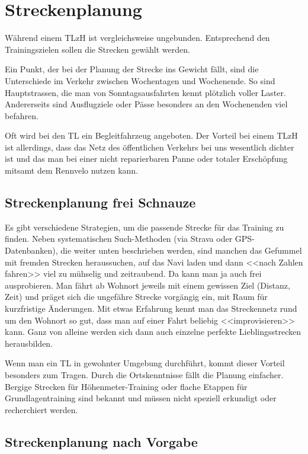 \documentclass[a4paper,DIV13,BCOR0cm,draft=TRUE]{scrartcl}
\newcommand{\rv}{Rennvelo}
\newcommand{\tlzh}{TLzH}
\begin{document}
\section{Streckenplanung}
\label{sec:streckenplaung}

Während einem \tlzh{} ist vergleichsweise ungebunden.
Entsprechend den Trainingszielen sollen die Strecken gewählt werden.

Ein Punkt, der bei der Planung der Strecke ins Gewicht fällt,
sind die Unterschiede im Verkehr zwischen Wochentagen und Wochenende.
So sind Hauptstrassen, die man von Sonntagsausfahrten kennt plötzlich voller Laster.
Andererseits sind Ausflugziele oder Pässe besonders an den Wochenenden viel befahren.

Oft wird bei den TL ein Begleitfahrzeug angeboten.
Der Vorteil bei einem \tlzh{} ist allerdings, dass das Netz des öffentlichen Verkehrs bei uns
wesentlich dichter ist und das man bei einer nicht reparierbaren Panne oder totaler Erschöpfung
mitsamt dem \rv{} nutzen kann.

\subsection{Streckenplanung frei Schnauze}

Es gibt verschiedene Strategien, um die passende Strecke für das Training zu finden.
Neben systematischen Such-Methoden (via Strava oder GPS-Datenbanken), die weiter unten
beschrieben werden, sind manchen das 
Gefummel mit fremden Strecken heraussuchen, auf das Navi
laden und dann <<nach Zahlen fahren>> viel zu mühselig und zeitraubend.
Da kann man ja auch frei ausprobieren. Man fährt ab Wohnort jeweils
mit einem gewissen Ziel (Distanz, Zeit) und präget sich die ungefähre Strecke vorgängig
ein, mit Raum für kurzfristige Änderungen. Mit etwas Erfahrung kennt man das
Streckennetz rund um den Wohnort so gut, dass man auf einer Fahrt beliebig
<<improvisieren>> kann. Ganz von alleine werden sich dann auch einzelne
perfekte Lieblingsstrecken herausbilden.

Wenn man ein TL in gewohnter Umgebung durchführt, kommt dieser Vorteil besonders zum Tragen.
Durch die Ortskenntnisse fällt die Planung einfacher.
Bergige Strecken für Höhenmeter-Training
oder flache Etappen für Grundlagentraining sind bekannt und müssen nicht speziell erkundigt oder 
recherchiert werden.

\subsection{Streckenplanung nach Vorgabe}
\end{document}
